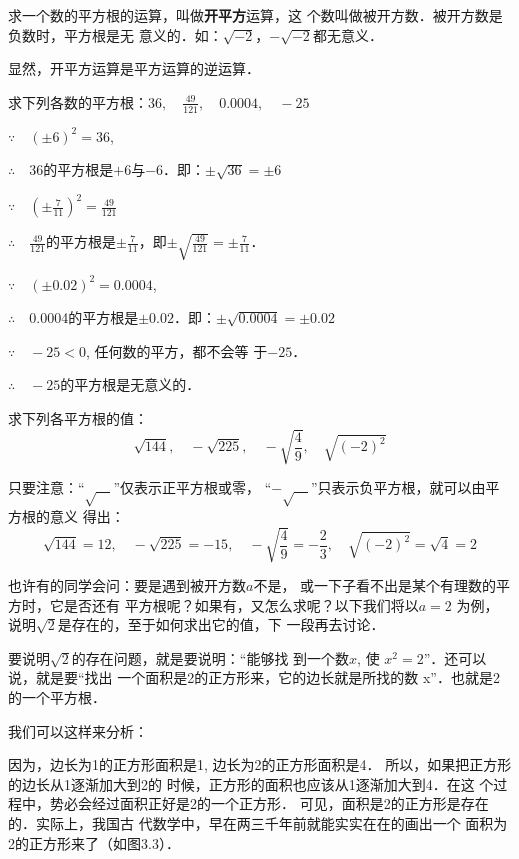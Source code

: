 求一个数的平方根的运算，叫做\textbf{开平方}运算，这
个数叫做被开方数．被开方数是负数时，平方根是无
意义的．如：$\sqrt{-2}$，$-\sqrt{-2}$都无意义．

显然，开平方运算是平方运算的逆运算．

\begin{example}
    求下列各数的平方根：$36,\quad \frac{49}{121},\quad 0.0004,\quad -25$
\end{example}

\begin{solution}
$\because\quad (\pm 6)^2=36$,

$\therefore\quad $36的平方根是$+6$与$-6$．即：$\pm\sqrt{36}=\pm 6$

$\because \quad \left(\pm \frac{7}{11}\right)^2=\frac{49}{121}$

$\therefore\quad \frac{49}{121}$的平方根是$\pm\frac{7}{11}$，即$\pm\sqrt{\frac{49}{121}}=\pm\frac{7}{11}$．

$\because\quad (\pm 0.02)^2=0.0004$,

$\therefore\quad $0.0004的平方根是$\pm 0.02$．即：$\pm\sqrt{0.0004}=\pm 0.02$

$\because\quad -25<0$, 任何数的平方，都不会等
于$-25$．

$\therefore\quad -25$的平方根是无意义的．
\end{solution}

\begin{example}
    求下列各平方根的值：
    \[\sqrt{144},\quad -\sqrt{225},\quad -\sqrt{\frac{4}{9}},\quad \sqrt{(-2)^2}   \]
\end{example}

\begin{solution}
    只要注意：“$\sqrt{\quad}$”仅表示正平方根或零，
    “$-\sqrt{\quad}$”只表示负平方根，就可以由平方根的意义
得出：
\[\sqrt{144}=12,\quad -\sqrt{225}=-15,\quad -\sqrt{\frac{4}{9}}=-\frac{2}{3},\quad \sqrt{(-2)^2}=\sqrt{4}=2   \]
\end{solution}
    

也许有的同学会问：要是遇到被开方数$a$不是，
或一下子看不出是某个有理数的平方时，它是否还有
平方根呢？如果有，又怎么求呢？以下我们将以$a=2$
为例，说明$\sqrt{2}$是存在的，至于如何求出它的值，下
一段再去讨论．

要说明$\sqrt{2}$的存在问题，就是要说明：“能够找
到一个数$x$, 使
$x^2=2$”．还可以说，就是要“找出
一个面积是2的正方形来，它的边长就是所找的数
x”．也就是2的一个平方根．

我们可以这样来分析：

因为，边长为1的正方形面积是1,
边长为2的正方形面积是4．
所以，如果把正方形的边长从1逐渐加大到2的
时候，正方形的面积也应该从1逐渐加大到4．在这
个过程中，势必会经过面积正好是2的一个正方形．
可见，面积是2的正方形是存在的．实际上，我国古
代数学中，早在两三千年前就能实实在在的画出一个
面积为2的正方形来了（如图3.3）．



